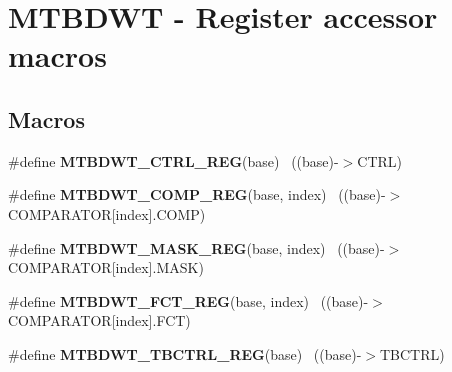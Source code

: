 \hypertarget{group___m_t_b_d_w_t___register___accessor___macros}{}\section{M\+T\+B\+D\+W\+T -\/ Register accessor macros}
\label{group___m_t_b_d_w_t___register___accessor___macros}
\subsection*{Macros}
\begin{DoxyCompactItemize}
\item 
\hypertarget{group___m_t_b_d_w_t___register___accessor___macros_gadc89cd5cdeb4ac5157a15669485ec578}{}\#define {\bfseries M\+T\+B\+D\+W\+T\+\_\+\+C\+T\+R\+L\+\_\+\+R\+E\+G}(base)                                    ~((base)-\/$>$C\+T\+R\+L)\label{group___m_t_b_d_w_t___register___accessor___macros_gadc89cd5cdeb4ac5157a15669485ec578}

\item 
\hypertarget{group___m_t_b_d_w_t___register___accessor___macros_gad57476689dc41b49e09cc1ba8202f8e4}{}\#define {\bfseries M\+T\+B\+D\+W\+T\+\_\+\+C\+O\+M\+P\+\_\+\+R\+E\+G}(base,  index)                        ~((base)-\/$>$C\+O\+M\+P\+A\+R\+A\+T\+O\+R\mbox{[}index\mbox{]}.C\+O\+M\+P)\label{group___m_t_b_d_w_t___register___accessor___macros_gad57476689dc41b49e09cc1ba8202f8e4}

\item 
\hypertarget{group___m_t_b_d_w_t___register___accessor___macros_ga5c5b8f3ae38de9e3006737c92fc2814c}{}\#define {\bfseries M\+T\+B\+D\+W\+T\+\_\+\+M\+A\+S\+K\+\_\+\+R\+E\+G}(base,  index)                        ~((base)-\/$>$C\+O\+M\+P\+A\+R\+A\+T\+O\+R\mbox{[}index\mbox{]}.M\+A\+S\+K)\label{group___m_t_b_d_w_t___register___accessor___macros_ga5c5b8f3ae38de9e3006737c92fc2814c}

\item 
\hypertarget{group___m_t_b_d_w_t___register___accessor___macros_gaa319e11200b9cc2fe7bfb0b5dd40d0e8}{}\#define {\bfseries M\+T\+B\+D\+W\+T\+\_\+\+F\+C\+T\+\_\+\+R\+E\+G}(base,  index)                          ~((base)-\/$>$C\+O\+M\+P\+A\+R\+A\+T\+O\+R\mbox{[}index\mbox{]}.F\+C\+T)\label{group___m_t_b_d_w_t___register___accessor___macros_gaa319e11200b9cc2fe7bfb0b5dd40d0e8}

\item 
\hypertarget{group___m_t_b_d_w_t___register___accessor___macros_ga8c3b4d03936e7f060a5c076768e31c3c}{}\#define {\bfseries M\+T\+B\+D\+W\+T\+\_\+\+T\+B\+C\+T\+R\+L\+\_\+\+R\+E\+G}(base)                                ~((base)-\/$>$T\+B\+C\+T\+R\+L)\label{group___m_t_b_d_w_t___register___accessor___macros_ga8c3b4d03936e7f060a5c076768e31c3c}


\end{DoxyCompactItemize}
